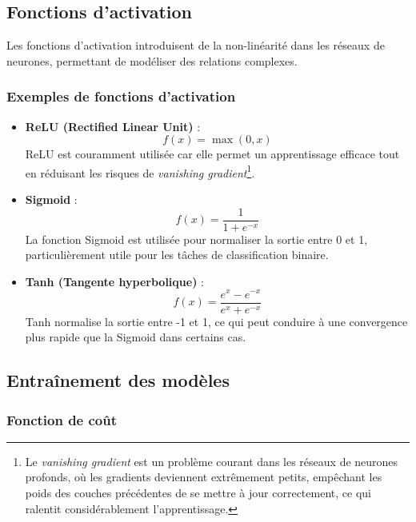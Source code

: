 \subsection{Fonctions d'activation}

Les fonctions d'activation introduisent de la non-linéarité dans les réseaux de neurones, permettant de modéliser des relations complexes.

\subsubsection*{Exemples de fonctions d'activation}

\begin{itemize}
	\item \textbf{ReLU (Rectified Linear Unit)} : 
	\[
	f(x) = \max(0, x)
	\]
	ReLU est couramment utilisée car elle permet un apprentissage efficace tout en réduisant les risques de \textit{vanishing gradient}\footnote{Le \textit{vanishing gradient} est un problème courant dans les réseaux de neurones profonds, où les gradients deviennent extrêmement petits, empêchant les poids des couches précédentes de se mettre à jour correctement, ce qui ralentit considérablement l'apprentissage.}.
	\item \textbf{Sigmoid} : 
	\[
	f(x) = \frac{1}{1 + e^{-x}}
	\]
	La fonction Sigmoid est utilisée pour normaliser la sortie entre 0 et 1, particulièrement utile pour les tâches de classification binaire.
	\item \textbf{Tanh (Tangente hyperbolique)} : 
	\[
	f(x) = \frac{e^x - e^{-x}}{e^x + e^{-x}}
	\]
	Tanh normalise la sortie entre -1 et 1, ce qui peut conduire à une convergence plus rapide que la Sigmoid dans certains cas.
\end{itemize}

\subsection{Entraînement des modèles}

\subsubsection{Fonction de coût}

